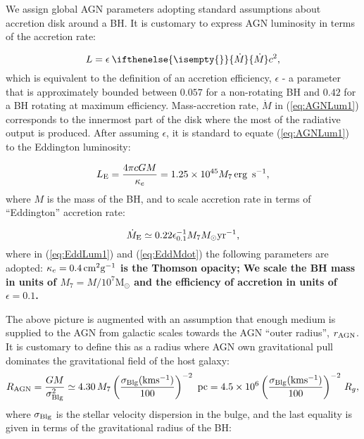 \documentclass[12pt,english,preprint]{aastex}
\newcommand{\Mdt}[1][]{ 
    \ifthenelse{\isempty{#1}}
    {\dot{M}_{}}
    { {\dot M}_{{#1}} } 
} %
\begin{document}
We assign global AGN parameters adopting standard assumptions about
accretion disk around a BH. It is customary to express AGN luminosity
in terms of the accretion rate:

\begin{equation}
L=\epsilon\:\Mdt c^{2},\label{eq:AGNLum1}
\end{equation}
which is equivalent to the definition of an accretion efficiency, $\epsilon$ -
a parameter that is approximately bounded between $0.057$
for a non-rotating BH and $0.42$ for a BH rotating at maximum efficiency.
Mass-accretion rate, ${\dot{M}}$ in (\ref{eq:AGNLum1}) corresponds
to the innermost part of the disk where the most of the radiative output
is produced. After assuming $\epsilon$, it is standard to equate (\ref{eq:AGNLum1}) to the Eddington luminosity:

\begin{equation}
L_{{\rm E}}=\frac{4\pi cGM}{\kappa_{e}}=1.25\times10^{45}M_{7}\text{\text{\,erg} }\,{\rm s}^{-1},\label{eq:EddLum1}
\end{equation}
where $M$ is the mass of the BH, and to scale accretion rate in terms
of ``Eddington'' accretion rate:

\begin{equation}
\dot{M}_{{\rm E}}\simeq0.22\epsilon_{0.1}^{-1}M_{7}M_{\odot}{\rm yr}^{-1}\mbox{,}\label{eq:EddMdot}
\end{equation}
where in (\ref{eq:EddLum1}) and (\ref{eq:EddMdot}) the following
parameters are adopted: $\kappa_{e}=0.4\,{\rm cm^{2}g^{-1}}$ {\bf is the
Thomson opacity; We scale the BH mass in units of $M_{7}=M/10^{7}\text{M}_{\odot}$
and  the efficiency of accretion in units of $\epsilon=0.1$. 
}

The above picture is augmented with an assumption that enough medium
is supplied to the AGN from galactic scales towards the AGN ``outer
radius'', $r_{{\rm AGN}}$. It is customary to define this as a radius
where AGN own gravitational pull dominates the gravitational field
of the host galaxy: 
\begin{equation}
R_{{\rm AGN}}=\frac{GM}{\sigma_{{\rm Blg}}^{2}}\simeq4.30\,M_{7}\left(\frac{\sigma_{{\rm Blg}}{\rm (km}{\rm s^{-1}})}{100}\right)^{-2}\text{ pc}=4.5\times10^{6}
\left(\frac{\sigma_{{\rm Blg}}{\rm (km}{\rm s^{-1}})}{100}\right)^{-2}\,{R_{g}},\label{eq:rAGN}
\end{equation}
where $\sigma_{{\rm Blg}}$ is the stellar velocity dispersion in
the bulge, and the last equality is given in terms of the gravitational
radius of the BH: 
\end{document}
